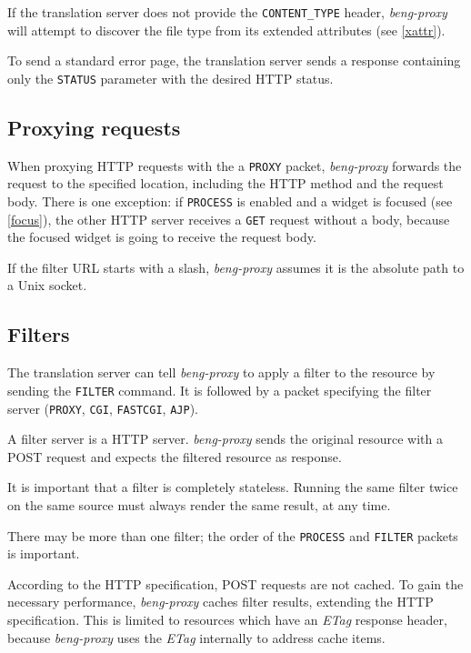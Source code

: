 \documentclass[a4paper,12pt]{article}
\begin{document}
If the translation server does not provide the \verb|CONTENT_TYPE|
header, \emph{beng-proxy} will attempt to discover the file type from
its extended attributes (see \ref{xattr}).

To send a standard error page, the translation server sends a response
containing only the \verb|STATUS| parameter with the desired HTTP
status.

\subsection{Proxying requests}

When proxying HTTP requests with the a \verb|PROXY| packet,
\emph{beng-proxy} forwards the request to the specified location,
including the HTTP method and the request body.  There is one
exception: if \verb|PROCESS| is enabled and a widget is focused (see
\ref{focus}), the
other HTTP server receives a \verb|GET| request without a body,
because the focused widget is going to receive the request body.

If the filter URL starts with a slash, \emph{beng-proxy} assumes it is
the absolute path to a Unix socket.

\subsection{Filters}
\label{filter}

The translation server can tell \emph{beng-proxy} to apply a filter to
the resource by sending the \verb|FILTER| command.  It is followed
by a packet specifying the filter server (\verb|PROXY|,
\verb|CGI|, \verb|FASTCGI|, \verb|AJP|).

A filter server is a HTTP server.  \emph{beng-proxy} sends the
original resource with a POST request and expects the filtered
resource as response.

It is important that a filter is completely stateless.  Running the
same filter twice on the same source must always render the same
result, at any time.

There may be more than one filter; the order of the \verb|PROCESS|
and \verb|FILTER| packets is important.

According to the HTTP specification, POST requests are not cached.  To
gain the necessary performance, \emph{beng-proxy} caches filter
results, extending the HTTP specification.  This is limited to
resources which have an \emph{ETag} response header, because
\emph{beng-proxy} uses the \emph{ETag} internally to address cache
items.
\end{document}
